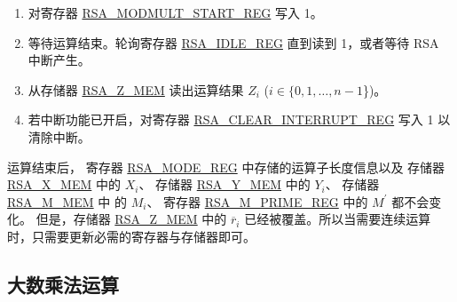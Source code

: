 \documentclass[main\_\_CN.tex]{subfiles}
\begin{document}
\begin{enumerate}
    \item 对寄存器 \hyperref[regdesc:RSAMODMULTSTARTREG]{RSA\_MODMULT\_START\_REG} 写入 1。

    \item 等待运算结束。轮询寄存器 \hyperref[regdesc:RSAIDLEREG]{RSA\_IDLE\_REG} 直到读到 1，或者等待 RSA 中断产生。

    \item 从存储器 \hyperref[regdesc:RSAmemory]{RSA\_Z\_MEM} 读出运算结果 \begin{math}Z_{i}\end{math} (\begin{math}i \in \{ 0, 1, \dots, n-1 \end{math}\})。

    \item 若中断功能已开启，对寄存器 \hyperref[regdesc:RSACLEARINTERRUPTREG]{RSA\_CLEAR\_INTERRUPT\_REG} 写入 1 以清除中断。

\end{enumerate}


运算结束后，
寄存器 \hyperref[regdesc:RSAMODEXPMODEREG]{RSA\_MODE\_REG} 中存储的运算子长度信息以及
存储器 \hyperref[regdesc:RSAmemory]{RSA\_X\_MEM} 中的 \begin{math}X_{i}\end{math}、
存储器 \hyperref[regdesc:RSAmemory]{RSA\_Y\_MEM} 中的 \begin{math}Y_{i}\end{math}、
存储器 \hyperref[regdesc:RSAmemory]{RSA\_M\_MEM} 中 的 \begin{math}M_{i}\end{math}、
寄存器 \hyperref[regdesc:RSAMPRIMEREG]{RSA\_M\_PRIME\_REG} 中的 \begin{math}M^{\prime}\end{math} 都不会变化。
但是，存储器 \hyperref[regdesc:RSAmemory]{RSA\_Z\_MEM} 中的 \begin{math}\overline{r}_{i}\end{math}
已经被覆盖。所以当需要连续运算时，只需要更新必需的寄存器与存储器即可。


\subsection{大数乘法运算}
\end{document}
